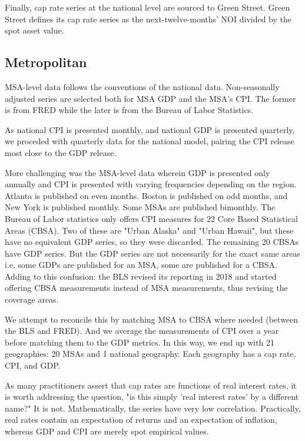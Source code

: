 Finally, cap rate series at the national level are sourced to Green Street. Green Street defines its cap rate series as the next-twelve-months' NOI divided by the spot asset value. 

\subsection{Metropolitan}

MSA-level data follows the conventions of the national data. Non-seasonally adjusted series are selected both for MSA GDP and the MSA's CPI. The former is from FRED while the later is from the Bureau of Labor Statistics.

As national CPI is presented monthly, and national GDP is presented quarterly, we proceded with quarterly data for the national model, pairing the CPI release most close to the GDP release. 

More challenging was the MSA-level data wherein GDP is presented only annually and CPI is presented with varying frequencies depending on the region. Atlanta is published on even months. Boston is published on odd months, and New York is published monthly. Some MSAs are published bimonthly. The Bureau of Labor statistics only offers CPI measures for 22 Core Based Statistical Areas (CBSA). Two of these are "Urban Alaska" and "Urban Hawaii", but these have no equivalent GDP series, so they were discarded. The remaining 20 CBSAs have GDP series. But the GDP series are not necessarily for the exact same areas i.e, some GDPs are published for an MSA, some are published for a CBSA. Adding to this confusion: the BLS revised its reporting in 2018 and started offering CBSA measurements instead of MSA measurements, thus revising the coverage areas.

We attempt to reconcile this by matching MSA to CBSA where needed (between the BLS and FRED). And we average the measurements of CPI over a year before matching them to the GDP metrics. In this way, we end up with 21 geographies: 20 MSAs and 1 national geography. Each geography has a cap rate, CPI, and GDP. 

As many practitioners assert that cap rates are functions of real interest rates, it is worth addressing the question, "is this simply 'real interest rates' by a different name?"  It is not. Mathematically, the series have very low correlation. Practically, real rates contain an expectation of returns and an expectation of inflation, whereas GDP and CPI are merely spot empirical values.
 
